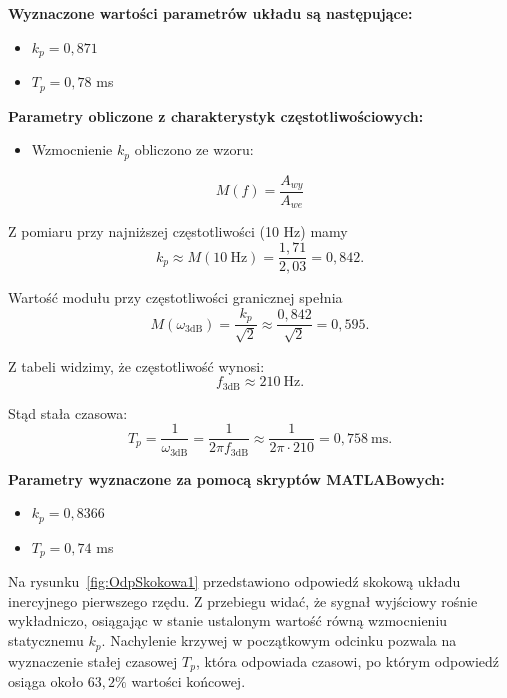 \documentclass[12pt,a4paper]{article}
\begin{document}
	\noindent \textbf{Wyznaczone wartości parametrów układu są następujące:}
	\begin{itemize}
		\item $k_p = 0{,}871$ 
		\item $T_p = 0{,}78$ ms
	\end{itemize}
	
	\noindent \textbf{Parametry obliczone z charakterystyk częstotliwościowych:}
	\begin{itemize}
		\item Wzmocnienie $k_p$ obliczono ze wzoru:
	\end{itemize}
	
	\begin{equation}
		M(f)=\frac{A_{wy}}{A_{we}}
	\end{equation}
	
	Z pomiaru przy najniższej częstotliwości (10 Hz) mamy
	\begin{equation}
		k_p \approx M(10\ \text{Hz}) = \frac{1{,}71}{2{,}03} = 0{,}842.
	\end{equation}
	
	Wartość modułu przy częstotliwości granicznej spełnia
	\begin{equation}
		M(\omega_{3\text{dB}})=\frac{k_p}{\sqrt{2}} \approx \frac{0{,}842}{\sqrt{2}} = 0{,}595.
	\end{equation}
	
	Z tabeli widzimy, że częstotliwość wynosi:
	\[
	f_{3\text{dB}} \approx 210\ \text{Hz}.
	\]
	
	Stąd stała czasowa:
	\begin{equation}
		T_p = \frac{1}{\omega_{3\text{dB}}} = \frac{1}{2\pi f_{3\text{dB}}}
		\approx \frac{1}{2\pi\cdot 210} = 0{,}758\ \text{ms}.
	\end{equation}
	
	\noindent \textbf{Parametry wyznaczone za pomocą skryptów MATLABowych:}
	\begin{itemize}
		\item $k_p = 0{,}8366$ 
		\item $T_p = 0{,}74$ ms
	\end{itemize}
	
	Na rysunku~\ref{fig:OdpSkokowa1} przedstawiono odpowiedź skokową układu inercyjnego pierwszego rzędu. 
	Z przebiegu widać, że sygnał wyjściowy rośnie wykładniczo, osiągając w stanie ustalonym wartość równą wzmocnieniu statycznemu $k_p$. 
	Nachylenie krzywej w początkowym odcinku pozwala na wyznaczenie stałej czasowej $T_p$, 
	która odpowiada czasowi, po którym odpowiedź osiąga około $63{,}2\%$ wartości końcowej.
	
\end{document}

